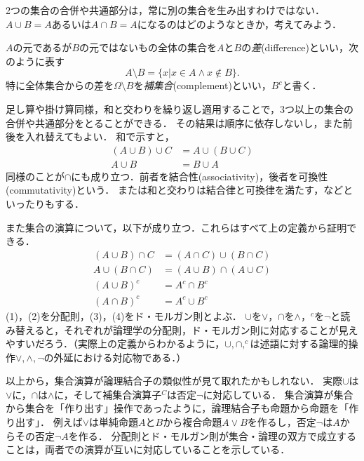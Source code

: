 \documentclass[11pt,a4paper]{jsarticle}
\begin{document}
\begin{attn}
 2つの集合の合併や共通部分は，常に別の集合を生み出すわけではない．$A \cup B = A$あるいは$A \cap B = A$になるのはどのようなときか，考えてみよう．
\end{attn}


$A$の元であるが$B$の元ではないもの全体の集合を$A$と$B$の\emph{差}(difference)といい，次のように表す
\[
 A \setminus B = \{ x | x \in A \wedge x \not\in B\}.
\]
特に全体集合からの差を$\Omega \setminus B$を\emph{補集合}(complement)といい，$B^c$と書く．

足し算や掛け算同様，和と交わりを繰り返し適用することで，3つ以上の集合の合併や共通部分をとることができる．
その結果は順序に依存しないし，また前後を入れ替えてもよい．
和で示すと，
\begin{align*}
 (A \cup B) \cup C & = A \cup (B \cup C) \\
 A \cup B & = B \cup A
\end{align*}
同様のことが$\cap$にも成り立つ．前者を結合性(associativity)，後者を可換性(commutativity)という．
または和と交わりは結合律と可換律を満たす，などといったりもする．

また集合の演算について，以下が成り立つ．これらはすべて上の定義から証明できる．
\begin{align}
(A \cup B) \cap C &= (A \cap C) \cup (B \cap C) \\
A \cup (B \cap C) &= (A \cup B) \cap (A \cup C) \\
(A \cup B)^c &= A^c \cap B^c \\
(A \cap B)^c &= A^c \cup B^c
\end{align}
(1)，(2)を分配則，(3)，(4)をド・モルガン則とよぶ．
$\cup$を$\vee$，$\cap$を$\wedge$，$^c$を$\neg$と読み替えると，それぞれが論理学の分配則，ド・モルガン則に対応することが見えやすいだろう．（実際上の定義からわかるように，$\cup, \cap, ^c$は述語に対する論理的操作$\vee, \wedge, \neg$の外延における対応物である．）

\begin{attn}
以上から，集合演算が論理結合子の類似性が見て取れたかもしれない．
実際$\cup$は$\vee$に，$\cap$は$\wedge$に，そして補集合演算子$^C$は否定$\neg$に対応している．
集合演算が集合から集合を「作り出す」操作であったように，論理結合子も命題から命題を「作り出す」．
例えば$\vee$は単純命題$A$と$B$から複合命題$A\vee B$を作るし，否定$\neg$は$A$からその否定$\neg A$を作る．
分配則とド・モルガン則が集合・論理の双方で成立することは，両者での演算が互いに対応していることを示している．
\end{attn}
\end{document}
